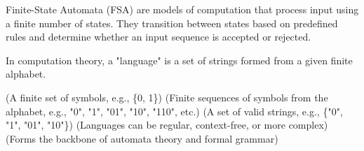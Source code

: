 \begin{NxSSSBox}
	\begin{NxIDBox}
	Finite-State Automata (FSA) are models of computation that process input using a finite number of states. They transition between states based on predefined rules and determine whether an input sequence is accepted or rejected.
	\end{NxIDBox}
\end{NxSSSBox}

\begin{NxSSSSBox}
	\begin{NxIDBox}
		In computation theory, a "language" is a set of strings formed from a given finite alphabet.
		\begin{NxListDark}
			 (A finite set of symbols, e.g., \{0, 1\})
			 (Finite sequences of symbols from the alphabet, e.g., "0", "1", "01", "10", "110", etc.)
			 (A set of valid strings, e.g., \{"0", "1", "01", "10"\})
			 (Languages can be regular, context-free, or more complex)
			 (Forms the backbone of automata theory and formal grammar)
		\end{NxListDark}
	\end{NxIDBox}
\end{NxSSSSBox}

